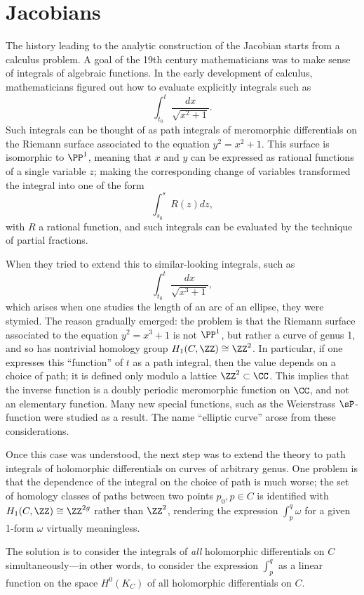 \section{Jacobians}

The history leading to the analytic construction of the Jacobian starts from a calculus problem. A goal of the 19th century mathematicians was  to make sense of integrals of algebraic functions. In the early development of calculus, mathematicians figured out how to evaluate explicitly integrals such as
$$
\int_{t_0}^t \frac{dx}{\sqrt{x^2+1}}.
$$
Such integrals can be thought of as path integrals of meromorphic differentials on the Riemann surface associated to the equation $y^2 = x^2+1$. This surface is isomorphic to $\PP^1$, meaning that $x$ and $y$ can be expressed as rational functions of a single variable $z$; making the corresponding change of variables transformed the integral into one of the form
$$
\int_{s_0}^s R(z)dz,
$$
with $R$ a rational function, and such integrals can be evaluated by the technique of partial fractions.

When they tried to extend this to similar-looking integrals, such as
$$
\int_{t_0}^t \frac{dx}{\sqrt{x^3+1}},
$$
which arises when one studies the length of an arc of an ellipse, they were stymied. The reason gradually emerged: the problem is that the Riemann surface associated to the equation $y^2 = x^3+1$ is not $\PP^1$, but rather a curve of genus 1, and so has nontrivial homology group $H_1(C, \ZZ) \cong \ZZ^2$. In particular, if one expresses this ``function'' of $t$  as a path integral, then the value depends on a choice of path; it is defined only modulo a lattice $\ZZ^2 \subset \CC$. This implies that the inverse function is a doubly periodic meromorphic function on $\CC$, and not an elementary function. Many new special functions, such as the Weierstrass $\sP$-function were studied as a result. The name ``elliptic curve'' arose from these considerations.

Once this case was understood, the next step was to extend the theory to path integrals of holomorphic differentials on curves of arbitrary genus. One problem is that the dependence of the integral on the choice of path is much worse; the set of homology classes of paths between two points $p_0, p \in C$ is identified with $H_1(C,\ZZ) \cong \ZZ^{2g}$ rather than $\ZZ^2$, rendering the expression $\int_p^q \omega$ for a given 1-form $\omega$ virtually meaningless.

The solution is to  consider the integrals of \emph{all} holomorphic differentials on $C$ simultaneously---in other words, to consider the expression $\int_p^q$ as a linear function on the space $H^0(K_C)$ of all holomorphic differentials on $C$.

